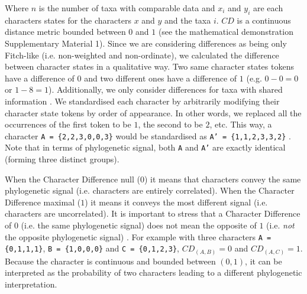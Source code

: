 \documentclass[12pt,letterpaper]{article}
\begin{document}
\noindent Where $n$ is the number of taxa with comparable data and $x_i$ and $y_i$ are each characters states for the characters $x$ and $y$ and the taxa $i$.
$CD$ is a continuous distance metric bounded between $0$ and $1$ (see the mathematical demonstration Supplementary Material 1).
Since we are considering differences as being only Fitch-like (i.e. non-weighted and non-ordinate), we calculated the difference between character states in a qualitative way.
Two same character states tokens have a difference of $0$ and two different ones have a difference of $1$ (e.g. $0 - 0 = 0$ or $1 - 8 = 1$).
Additionally, we only consider differences for taxa with shared information \citep[i.e. a Gower distance;][]{GowerDist}.
We standardised each character by arbitrarily modifying their character state tokens by order of appearance.
In other words, we replaced all the occurrences of the first token to be $1$, the second to be $2$, etc.
This way, a character \texttt{A = \{2,2,3,0,0,3\}} would be standardised as \texttt{A' = \{1,1,2,3,3,2\}} \citep[following the \textit{xyz} notation in][p.13]{felsenstein2004inferring}.
Note that in terms of phylogenetic signal, both \texttt{A} and \texttt{A'} are exactly identical (forming three distinct groups).

When the Character Difference null ($0$) it means that characters convey the same phylogenetic signal (i.e. characters are entirely correlated).
When the Character Difference maximal ($1$) it means it conveys the most different signal (i.e. characters are uncorrelated).
It is important to stress that a Character Difference of $0$ (i.e. the same phylogenetic signal) does not mean the opposite of $1$ (i.e. \textit{not} the opposite phylogenetic signal) .
For example with three characters \texttt{A = \{0,1,1,1\}}, \texttt{B = \{1,0,0,0\}} and \texttt{C = \{0,1,2,3\}}, $CD_{(A,B)} = 0$ and $CD_{(A,C)} = 1$.
Because the character is continuous and bounded between $(0,1)$, it can be interpreted as the probability of two characters leading to a different phylogenetic interpretation.
\end{document}
